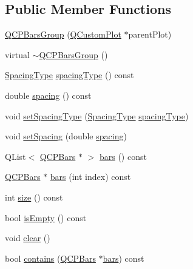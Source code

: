 \subsection*{Public Member Functions}
\begin{DoxyCompactItemize}
\item 
\mbox{\hyperlink{class_q_c_p_bars_group_aa4e043b9a22c6c5ea0f93740aca063e1}{Q\+C\+P\+Bars\+Group}} (\mbox{\hyperlink{class_q_custom_plot}{Q\+Custom\+Plot}} $\ast$parent\+Plot)
\item 
virtual \mbox{\hyperlink{class_q_c_p_bars_group_adb9475bcb6a5f18c8918e17d939d8dbd}{$\sim$\+Q\+C\+P\+Bars\+Group}} ()
\item 
\mbox{\hyperlink{class_q_c_p_bars_group_a4c0521120a97e60bbca37677a37075b6}{Spacing\+Type}} \mbox{\hyperlink{class_q_c_p_bars_group_a894a77c45325aad2e742d936bc1f8aea}{spacing\+Type}} () const
\item 
double \mbox{\hyperlink{class_q_c_p_bars_group_a314d09aeb2ad209518b9183ca7ffe662}{spacing}} () const
\item 
void \mbox{\hyperlink{class_q_c_p_bars_group_a2c7e2d61b10594a4555b615e1fcaf49e}{set\+Spacing\+Type}} (\mbox{\hyperlink{class_q_c_p_bars_group_a4c0521120a97e60bbca37677a37075b6}{Spacing\+Type}} \mbox{\hyperlink{class_q_c_p_bars_group_a894a77c45325aad2e742d936bc1f8aea}{spacing\+Type}})
\item 
void \mbox{\hyperlink{class_q_c_p_bars_group_aa553d327479d72a0c3dafcc724a190e2}{set\+Spacing}} (double \mbox{\hyperlink{class_q_c_p_bars_group_a314d09aeb2ad209518b9183ca7ffe662}{spacing}})
\item 
Q\+List$<$ \mbox{\hyperlink{class_q_c_p_bars}{Q\+C\+P\+Bars}} $\ast$ $>$ \mbox{\hyperlink{class_q_c_p_bars_group_a6e4f4e86abbec6a9342f204ef82abef8}{bars}} () const
\item 
\mbox{\hyperlink{class_q_c_p_bars}{Q\+C\+P\+Bars}} $\ast$ \mbox{\hyperlink{class_q_c_p_bars_group_a0754d659a020aa7fddfe81e657ce2d92}{bars}} (int index) const
\item 
int \mbox{\hyperlink{class_q_c_p_bars_group_a3780ec77919cb00840207ec7a0f00dd5}{size}} () const
\item 
bool \mbox{\hyperlink{class_q_c_p_bars_group_aac959e79e852e8ef9aea6e0449ad000a}{is\+Empty}} () const
\item 
void \mbox{\hyperlink{class_q_c_p_bars_group_a3ddf23928c6cd89530bd34ab7ba7b177}{clear}} ()
\item 
bool \mbox{\hyperlink{class_q_c_p_bars_group_ae26da07a23553052a178fb3fae90d0dc}{contains}} (\mbox{\hyperlink{class_q_c_p_bars}{Q\+C\+P\+Bars}} $\ast$\mbox{\hyperlink{class_q_c_p_bars_group_a6e4f4e86abbec6a9342f204ef82abef8}{bars}}) const

\end{DoxyCompactItemize}
